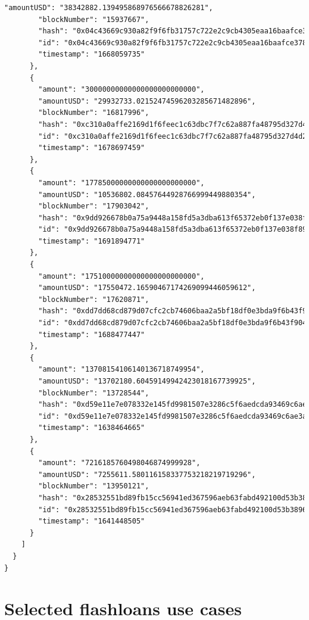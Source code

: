 \documentclass[11pt,a4paper,titlepage]{scrartcl}
\begin{document}
\begin{lstlisting}[language=xml, caption={ JSON response for top 10 usd amount flashloans}, label={lst:fl_topten_rsp}, basicstyle=\ttfamily\scriptsize]
        "amountUSD": "38342882.139495868976566678826281",
        "blockNumber": "15937667",
        "hash": "0x04c43669c930a82f9f6fb31757c722e2c9cb4305eaa16baafce378aa1c09e98e",
        "id": "0x04c43669c930a82f9f6fb31757c722e2c9cb4305eaa16baafce378aa1c09e98e1000000006000000",
        "timestamp": "1668059735"
      },
      {
        "amount": "30000000000000000000000000",
        "amountUSD": "29932733.02152474596203285671482896",
        "blockNumber": "16817996",
        "hash": "0xc310a0affe2169d1f6feec1c63dbc7f7c62a887fa48795d327d4d2da2d6b111d",
        "id": "0xc310a0affe2169d1f6feec1c63dbc7f7c62a887fa48795d327d4d2da2d6b111d3700000006000000",
        "timestamp": "1678697459"
      },
      {
        "amount": "17785000000000000000000000",
        "amountUSD": "10536802.08457644928766999449880354",
        "blockNumber": "17903042",
        "hash": "0x9dd926678b0a75a9448a158fd5a3dba613f65372eb0f137e038f89ba8c891435",
        "id": "0x9dd926678b0a75a9448a158fd5a3dba613f65372eb0f137e038f89ba8c8914353f02000006000000",
        "timestamp": "1691894771"
      },
      {
        "amount": "17510000000000000000000000",
        "amountUSD": "17550472.16590467174269099446059612",
        "blockNumber": "17620871",
        "hash": "0xdd7dd68cd879d07cfc2cb74606baa2a5bf18df0e3bda9f6b43f904f4f7bbdfc1",
        "id": "0xdd7dd68cd879d07cfc2cb74606baa2a5bf18df0e3bda9f6b43f904f4f7bbdfc17800000006000000",
        "timestamp": "1688477447"
      },
      {
        "amount": "13708154106140136718749954",
        "amountUSD": "13702180.60459149942423018167739925",
        "blockNumber": "13728544",
        "hash": "0xd59e11e7e078332e145fd9981507e3286c5f6aedcda93469c6ae3af46f5cdfe6",
        "id": "0xd59e11e7e078332e145fd9981507e3286c5f6aedcda93469c6ae3af46f5cdfe61b02000006000000",
        "timestamp": "1638464665"
      },
      {
        "amount": "7216185760498046874999928",
        "amountUSD": "7255611.580116158337753218219719296",
        "blockNumber": "13950121",
        "hash": "0x28532551bd89fb15cc56941ed367596aeb63fabd492100d53b3896b7ad9d5ce5",
        "id": "0x28532551bd89fb15cc56941ed367596aeb63fabd492100d53b3896b7ad9d5ce58200000006000000",
        "timestamp": "1641448505"
      }
    ]
  }
}
\end{lstlisting}

\newpage

\section{Selected flashloans use cases}
\end{document}
